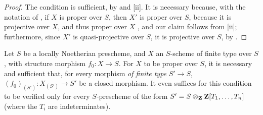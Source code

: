 \begin{proof}
\label{proof-II.5.6.2}
The condition is sufficient, by  and [ii].
It is necessary because, with the notation of , if $X$ is proper over $S$, then $X'$ is proper over $S$, because it is projective over $X$, and thus proper over $X$ , and our claim follows from [ii]; furthermore, since $X'$ is quasi-projective over $S$, it is projective over $S$, by .
\end{proof}

\begin{corollary}[5.6.3]
\label{II.5.6.3}
Let $S$ be a locally Noetherian prescheme, and $X$ an $S$-scheme of finite type over $S$, with structure morphism $f_0:X\to S$.
For $X$ to be proper over $S$, it is necessary and sufficient that, for every morphism \emph{of finite type} $S'\to S$, $(f_0)_{(S')}:X_{(S')}\to S'$ be a closed morphism.
It even suffices for this condition to be verified only for every $S$-prescheme of the form $S'=S\otimes_\mathbf{Z}\mathbf{Z}[T_1,\ldots,T_n]$ (where the $T_i$ are indeterminates).
\end{corollary}

